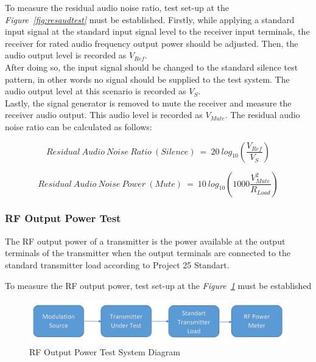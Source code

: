 	To measure the residual audio noise ratio, test set-up at the \textit{Figure~\ref{fig:resaudtest}} must be established. Firstly, while applying a standard input signal at the standard input signal level to the receiver input terminals, the receiver for rated audio frequency output power should be adjusted. Then, the audio output level is recorded as $V_{Ref}$.\\
	
	After doing so, the input signal should be changed to the standard silence test pattern, in other words no signal should be supplied to the test system. The audio output level at this scenario is recorded as $V_{S}$.\\
	
	Lastly, the signal generator is removed to mute the receiver and measure the receiver audio output. This audio level is recorded as $V_{Mute}$. The residual audio noise ratio can be calculated as follows:
	
$$	Residual~Audio~Noise~Ratio~(Silence)~=~20~log_{10}(\frac{V_{Ref}}{V_{S}}) 	$$

$$	Residual~Audio~Noise~Power~(Mute)~=~10~log_{10}(1000\frac{V^2_{Mute}}{R_{Load}}) 	$$



\subsubsection{RF Output Power Test}
\- \indent
	The RF output power of a transmitter is the power available at the output terminals of the transmitter when the output terminals are connected to the standard transmitter load according to Project 25 Standart\cite{P25}.

	To measure the RF output power, test set-up at the \textit{Figure~\ref{fig:rfouttest}} must be established
	
	
\begin{figure}[H]
	\center
	\setlength{\unitlength}{\textwidth} 
	\includegraphics[width=1.0\unitlength]{rfouttest}
	\caption{\label{fig:rfouttest}RF Output Power Test System Diagram }
\end{figure}




